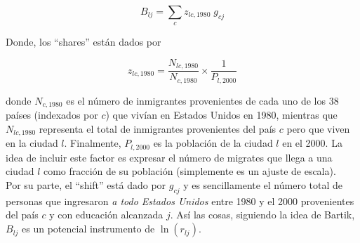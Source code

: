 \documentclass[a4paper, answers, addpoints, 11pt]{exam}
\begin{document}
$$B_{lj}=\sum_c z_{lc,1980} \; g_{cj}$$

Donde, los ``shares'' están dados por 

$$z_{lc,1980}=\dfrac{N_{lc,1980}}{N_{c,1980}} \times \dfrac{1}{P_{l,2000}}$$

donde $N_{c,1980}$ es el número de inmigrantes provenientes de cada uno de los 38 países (indexados por $c$) que vivían en Estados Unidos en 1980, mientras que $N_{lc,1980}$ representa el total de inmigrantes provenientes del país $c$ pero que viven en la ciudad $l$. Finalmente, $P_{l,2000}$ es la población de la ciudad $l$ en el 2000. La idea de incluir este factor es expresar el número de migrates que llega a una ciudad $l$ como fracción de su población (simplemente es un ajuste de escala).\\

Por su parte, el ``shift'' está dado por $g_{cj}$ y es sencillamente el número total de personas que ingresaron \textit{a todo Estados Unidos} entre 1980 y el 2000 provenientes del país $c$ y con educación alcanzada $j$. Así las cosas, siguiendo la idea de Bartik, $B_{lj}$ es un potencial instrumento de $\ln(r_{lj})$.\\
\end{document}
